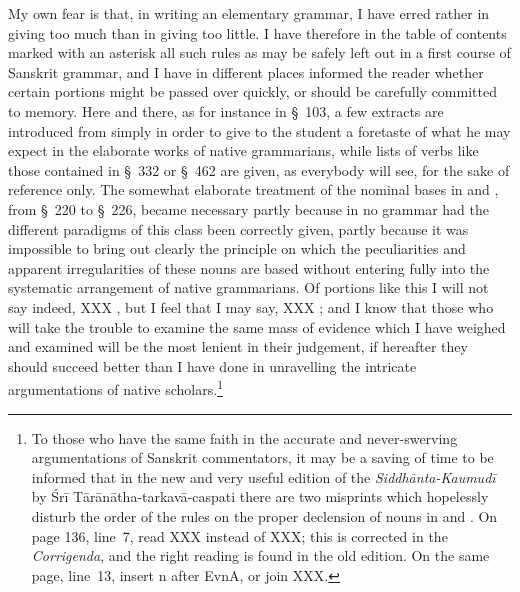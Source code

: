 My own fear is that, in writing an elementary grammar, I have erred
rather in giving too much than in giving too little. I have therefore in
the table of contents marked with an asterisk all such rules as may be
safely left out in a first course of Sanskrit grammar, and I have in
different places informed the reader whether certain portions might be
passed over quickly, or should be carefully committed to memory. Here
and there, as for instance in \S~103, a few extracts are introduced from
\panini{} simply in order to give to the student a foretaste of what he
may expect in the elaborate works of native grammarians, while lists of
verbs like those contained in \S~332 or \S~462 are given, as everybody
will see, for the sake of reference only. The somewhat elaborate
treatment of the nominal bases in  and , from \S~220 to
\S~226, became necessary partly because in no grammar had the different
paradigms of this class been correctly given, partly because it was
impossible to bring out clearly the principle on which the peculiarities
and apparent irregularities of these nouns are based without entering
fully into the systematic arrangement of native grammarians. Of portions
like this I will not say indeed,
XXX
, but I feel that I may say,
XXX
; and I know that those who will take the trouble to examine the same
mass of evidence which I have weighed and examined will be the most
lenient in their judgement, if hereafter they should succeed better than
I have done in unravelling the intricate argumentations of native
scholars.\footnote{To those who have the same faith in the accurate and
  never-swerving argumentations of Sanskrit commentators, it may be a
  saving of time to be informed that in the new and very useful edition
  of the \emph{Siddhānta-Kaumudī} by Śrī Tārānātha-tarkavā-caspati there
  are two misprints which hopelessly disturb the order of the rules on
  the proper declension of nouns in  and . On page 136,
  line~7, read XXX instead of XXX; this is corrected in the
  \emph{Corrigenda}, and the right reading is found in the old edition.
  On the same page, line~13, insert {\dn n} after {\dn EvnA}, or join XXX.}


